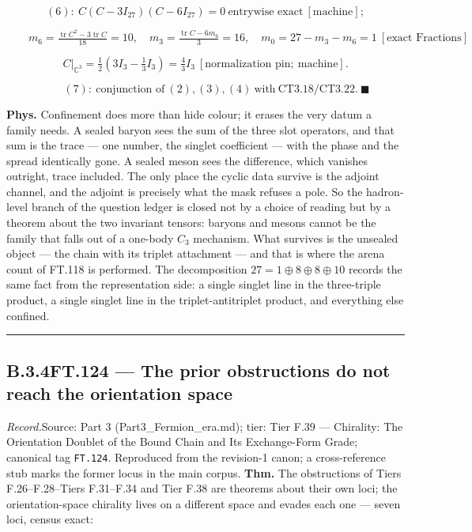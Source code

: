 \documentclass[11pt,openany]{report}
\theoremstyle{canonplain}
\theoremstyle{canondef}
\begin{document}
\[
(6):\ C(C-3I_{27})(C-6I_{27})=0\ \text{entrywise exact}\ [\text{machine}];
\]

\[
\qquad m_6=\tfrac{\operatorname{tr}C^2-3\operatorname{tr}C}{18}=10,\quad m_3=\tfrac{\operatorname{tr}C-6m_6}{3}=16,\quad m_0=27-m_3-m_6=1\ [\text{exact Fractions}]
\]

\[
C\big|_{\mathbb C^3}=\tfrac12(3I_3-\tfrac13I_3)=\tfrac43I_3\ [\text{normalization pin};\ \text{machine}].
\]

\[
\qquad (7):\ \text{conjunction of}\ (2),(3),(4)\ \text{with}\ \mathrm{CT3.18}/\mathrm{CT3.22}.\ \blacksquare
\]

\textbf{Phys.} Confinement does more than hide colour; it erases the very datum a family needs. A sealed baryon sees the sum of the three slot operators, and that sum is the trace — one number, the singlet coefficient — with the phase and the spread identically gone. A sealed meson sees the difference, which vanishes outright, trace included. The only place the cyclic data survive is the adjoint channel, and the adjoint is precisely what the mask refuses a pole. So the hadron-level branch of the question ledger is closed not by a choice of reading but by a theorem about the two invariant tensors: baryons and mesons cannot be the family that falls out of a one-body $C_3$ mechanism. What survives is the unsealed object — the chain with its triplet attachment — and that is where the arena count of FT.118 is performed. The decomposition $27=1\oplus8\oplus8\oplus10$ records the same fact from the representation side: a single singlet line in the three-triple product, a single singlet line in the triplet-antitriplet product, and everything else confined.

\vspace{2pt}\noindent\rule{\textwidth}{0.4pt}\vspace{2pt}

\medskip
\subsection*{\texorpdfstring{B.3.4\quad FT.124 — The prior obstructions do not reach the orientation space}{FT.124 B.3.4}}
\label{tag:FT-124}
{\small \textit{Record.}\quad Source: Part 3 (Part3\_Fermion\_era.md); tier: Tier F.39 — Chirality: The Orientation Doublet of the Bound Chain and Its Exchange-Form Grade; canonical tag \texttt{FT.124}. Reproduced from the revision-1 canon; a cross-reference stub marks the former locus in the main corpus.}
\medskip
\textbf{Thm.} The obstructions of Tiers F.26–F.28–Tiers F.31–F.34 and Tier F.38 are theorems about their own loci; the orientation-space chirality lives on a different space and evades each one — seven loci, census exact:
\end{document}
